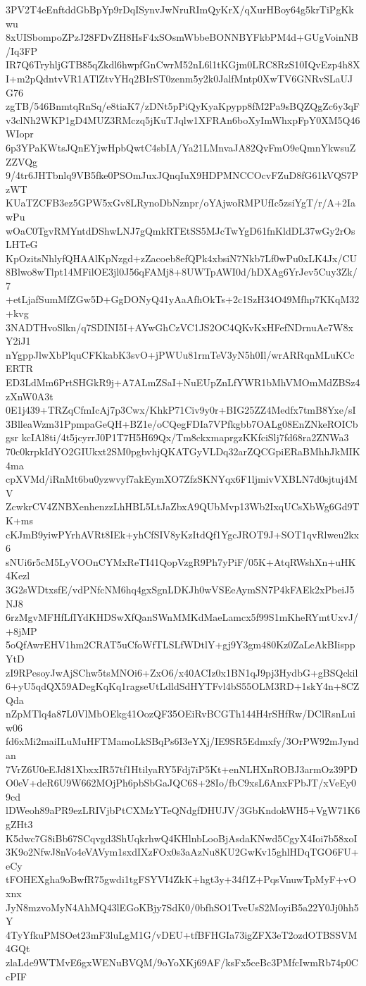3PV2T4eEnftddGbBpYp9rDqISynvJwNruRImQyKrX/qXurHBoy64g5krTiPgKkwu
8xUISbompoZPzJ28FDvZH8HsF4xSOsmWbbeBONNBYFkbPM4d+GUgVoinNB/Iq3FP
IR7Q6TryhljGTB85qZkdl6hwpfGnCwrM52nL6l1tKGjm0LRC8RzS10IQvEzp4h8X
I+m2pQdntvVR1ATlZtvYHq2BIrST0zenm5y2k0JalfMntp0XwTV6GNRvSLaUJG76
zgTB/546BnmtqRnSq/e8tiaK7/zDNt5pPiQyKyaKpypp8fM2Pa9sBQZQgZc6y3qF
v3clNh2WKP1gD4MUZ3RMczq5jKuTJqlw1XFRAn6boXyImWhxpFpY0XM5Q46WIopr
6p3YPaKWtsJQnEYjwHpbQwtC4sbIA/Ya21LMnvaJA82QvFmO9eQmnYkwsuZZZVQg
9/4tr6JHTbnlq9VB5fke0PSOmJuxJQnqIuX9HDPMNCCOcvFZuD8fG61kVQS7PzWT
KUaTZCFB3ez5GPW5xGv8LRynoDbNznpr/oYAjwoRMPUfIc5zsiYgT/r/A+2IawPu
wOaC0TgvRMYntdDShwLNJ7gQmkRTEtSS5MJcTwYgD61fnKldDL37wGy2rOsLHTeG
KpOzitsNhlyfQHAAlKpNzgd+zZacoeb8efQPk4xbsiN7Nkb7Lf0wPu0xLK4Jx/CU
8Blwo8wTlpt14MFilOE3jl0J56qFAMj8+8UWTpAWI0d/hDXAg6YrJev5Cuy3Zk/7
+etLjafSumMfZGw5D+GgDONyQ41yAaAfhOkTs+2c1SzH34O49Mfhp7KKqM32+kvg
3NADTHvoSlkn/q7SDINI5I+AYwGhCzVC1JS2OC4QKvKxHFefNDrnuAe7W8xY2iJ1
nYgppJlwXbPlquCFKkabK3svO+jPWUu81rmTeV3yN5h0Il/wrARRqnMLuKCcERTR
ED3LdMm6PrtSHGkR9j+A7ALmZSaI+NuEUpZnLfYWR1bMhVMOmMdZBSz4zXnW0A3t
0E1j439+TRZqCfmIcAj7p3Cwx/KhkP71Civ9y0r+BIG25ZZ4Medfx7tmB8Yxe/sI
3BlleaWzm31PpmpaGeQH+BZ1e/oCQegFDIa7VPfkgbb7OALg08EnZNkeROICbgsr
kcIAl8ti/4t5jcyrrJ0P1T7H5H69Qx/Tm8ckxmaprgzKKfciSlj7fd68ra2ZNWa3
70c0krpkIdYO2GIUkxt2SM0pgbvhjQKATGyVLDq32arZQCGpiERaBMhhJkMIK4ma
cpXVMd/iRnMt6bu0yzwvyf7akEymXO7ZfzSKNYqx6F1ljmivVXBLN7d0sjtuj4MV
ZcwkrCV4ZNBXenhenzzLhHBL5LtJaZbxA9QUbMvp13Wb2IxqUCsXbWg6Gd9TK+ms
cKJmB9yiwPYrhAVRt8IEk+yhCfSIV8yKzItdQf1YgcJROT9J+SOT1qvRlweu2kx6
sNUi6r5cM5LyVOOnCYMxReTI41QopVzgR9Ph7yPiF/05K+AtqRWshXn+uHK4Kezl
3G2sWDtxsfE/vdPNfcNM6hq4gxSgnLDKJh0wVSEeAymSN7P4kFAEk2xPbeiJ5NJ8
6rzMgvMFHfLfIYdKHDSwXfQanSWnMMKdMaeLamcx5f99S1mKheRYmtUxvJ/+8jMP
5oQfAwrEHV1hm2CRAT5uCfoWfTLSLfWDtlY+gj9Y3gm480Kz0ZaLeAkBIisppYtD
zI9RPesoyJwAjSChw5tsMNOi6+ZxO6/x40ACIz0x1BN1qJ9pj3HydbG+gBSQckil
6+yU5qdQX59ADegKqKq1ragseUtLdldSdHYTFvl4bS55OLM3RD+1skY4n+8CZQda
nZpMTlq4a87L0VlMbOEkg41OozQF35OEiRvBCGTh144H4rSHfRw/DClRsnLuiw06
fd6xMi2maiILuMuHFTMamoLkSBqPs6I3eYXj/IE9SR5Edmxfy/3OrPW92mJyndan
7VrZ6U0eEJd81XbxxIR57tf1HtilyaRY5Fdj7iP5Kt+enNLHXnROBJ3armOz39PD
O0eV+deR6U9W662MOjPh6pbSbGaJQC6S+28Io/fbC9xsL6AnxFPbJT/xVeEy09cd
lDWeoh89aPR9ezLRIVjbPtCXMzYTeQNdgfDHUJV/3GbKndokWH5+VgW71K6gZHt3
K5dwc7G8iBb67SCqvgd3ShUqkrhwQ4KHlnbLooBjAsdaKNwd5CgyX4Ioi7b58xoI
3K9o2NfwJ8nVo4eVAVym1sxdIXzFOx0s3aAzNu8KU2GwKv15ghlHDqTGO6FU+eCy
tFOHEXgha9oBwfR75gwdi1tgFSYVI4ZkK+hgt3y+34f1Z+PqsVnuwTpMyF+vOxnx
JyN8mzvoMyN4AhMQ43lEGoKBjy7SdK0/0bfhSO1TveUsS2MoyiB5a22Y0Jj0hh5Y
4TyYfkuPMSOet23mF3luLgM1G/vDEU+tfBFHGIa73igZFX3eT2ozdOTBSSVM4GQt
zlaLde9WTMvE6gxWENuBVQM/9oYoXKj69AF/ksFx5ceBc3PMfcIwmRb74p0CcPIF
